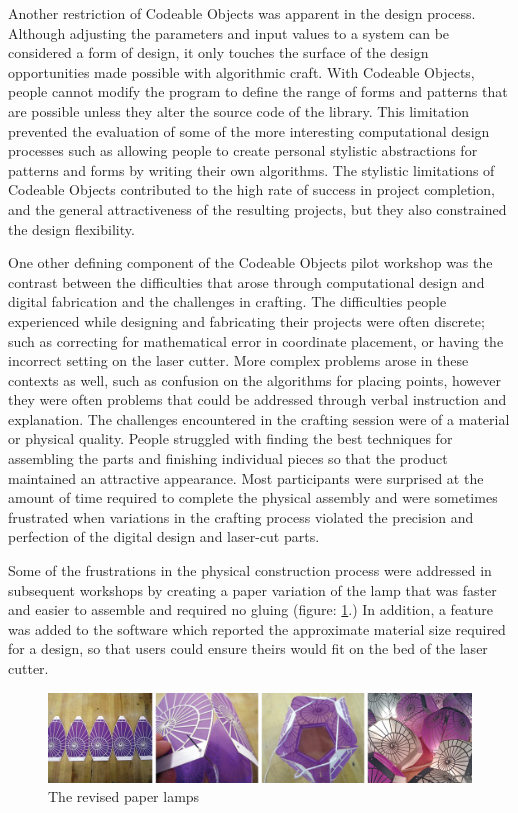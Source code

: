 Another restriction of Codeable Objects was apparent in the design process. Although adjusting the parameters and input values to a system can be considered a form of design, it only touches the surface of the design opportunities made possible with algorithmic craft. With Codeable Objects, people cannot modify the program to define the range of forms and patterns that are possible unless they alter the source code of the library. This limitation prevented the evaluation of some of the more interesting computational design processes such as allowing people to create personal stylistic abstractions for patterns and forms by writing their own algorithms. The stylistic limitations of Codeable Objects contributed to the high rate of success in project completion, and the general attractiveness of the resulting projects, but they also constrained the design flexibility. 

One other defining component of the Codeable Objects pilot workshop was the contrast between the difficulties that arose through computational design and digital fabrication and the challenges in crafting. The difficulties people experienced while designing and fabricating their projects were often discrete; such as correcting for mathematical error in coordinate placement, or having the incorrect setting on the laser cutter. More complex problems arose in these contexts as well, such as confusion on the algorithms for placing points, however they were often problems that could be addressed through verbal instruction and explanation. The challenges encountered in the crafting session were of a material or physical quality. People struggled with finding the best techniques for assembling the parts and finishing individual pieces so that the product maintained an attractive appearance. Most participants were surprised at the amount of time required to complete the physical assembly and were sometimes frustrated when variations in the crafting process violated the precision and perfection of the digital design and laser-cut parts. 

Some of the frustrations in the physical construction process were addressed in subsequent workshops by creating a paper variation of the lamp that was faster and easier to assemble and required no gluing (figure: \ref{fig:paper_lamp}.) In addition, a feature was added to the software which reported the approximate material size required for a design, so that users could ensure theirs would fit on the bed of the laser cutter. 
\begin{center}
\begin{figure}[h!]
\includegraphics[width=\columnwidth]{images/paper_lamps.png}
\caption{The revised paper lamps}
\label{fig:paper_lamp}
\end{figure}
\end{center}

